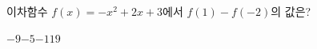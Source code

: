 이차함수 $f(x)=-x^2+2x+3$에서 $f(1)-f(-2)$의 값은?
\begin{choices32}{$-9$}{$-5$}{$-1$}{$1$}{$9$}\end{choices32}
